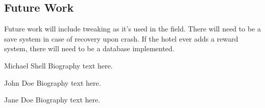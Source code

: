 \documentclass[10pt,conference,onecolumn,compsoc]{IEEEtran}
\begin{document}
\subsection{Future Work}
Future work will include tweaking as it's used in the field. There will need to be a save system in case of recovery upon crash. If the hotel ever adds a reward system, there will need to be a database implemented. 




\begin{IEEEbiography}{Michael Shell}
Biography text here.
\end{IEEEbiography}

\begin{IEEEbiographynophoto}{John Doe}
Biography text here.
\end{IEEEbiographynophoto}

\begin{IEEEbiographynophoto}{Jane Doe}
Biography text here.
\end{IEEEbiographynophoto}
\end{document}
